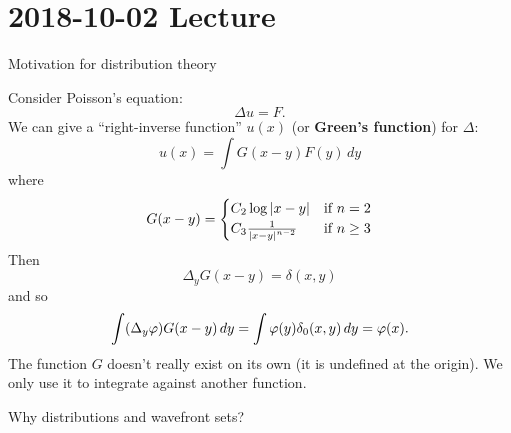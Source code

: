 \section{2018-10-02 Lecture}

Motivation for distribution theory

Consider Poisson's equation:
\[ \Delta u=F. \]
We can give a ``right-inverse function'' $u(x)$ (or \textbf{Green's function}) for $\Delta$:
\[ u(x) = \int G(x-y)F(y) \, dy \]
where
\begin{equation*}
  G(x-y)=
  \begin{cases}
    C_2\log\left\lvert x-y \right\rvert & \text{if }n=2 \\
    C_3\frac1{\left\lvert x-y \right\rvert^{n-2}} & \text{if }n\geq3
  \end{cases}
\end{equation*}
Then
\[ \Delta_y G(x-y) = \delta(x,y) \]
and so
\[ \int (\Delta_y\varphi) G(x-y) \, dy = \int \varphi(y) \delta_0(x,y) \, dy = \varphi(x). \]
The function $G$ doesn't really exist on its own (it is undefined at the origin).
We only use it to integrate against another function.

Why distributions and wavefront sets?

